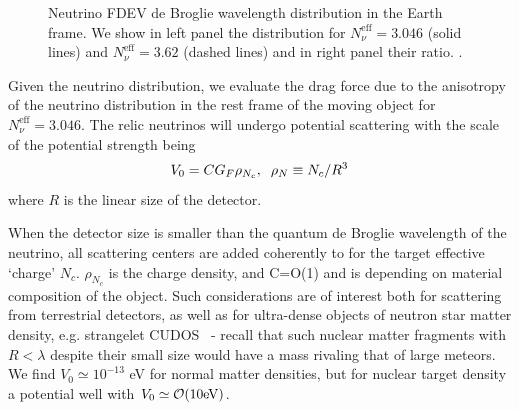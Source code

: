 \begin{figure} 
\begin{minipage}{\textwidth}
\end{minipage}
\caption{Neutrino  FDEV de Broglie wavelength  distribution in the Earth frame. We show in left panel the distribution for $N_\nu^{\mathrm{eff}}=3.046$ (solid lines) and $N_\nu^{\mathrm{eff}}=3.62$ (dashed lines) and in right panel their ratio. .  }\label{fig:deBrogle300}
 \end{figure}

Given the neutrino distribution, we evaluate the drag force due to the anisotropy of the neutrino distribution in the rest frame of the moving object for $N_\nu^{\mathrm{eff}}=3.046$. The relic neutrinos will undergo potential scattering with the scale of the potential strength being
\begin{equation}\label{V0}
V_0=CG_F\rho_{N_c},\hspace{2mm} \rho_N\equiv N_c/R^3
\end{equation}
where $R$ is the linear size of the detector.  

When the detector size is smaller than the quantum de Broglie wavelength of the neutrino, all scattering centers are added coherently to for the target effective `charge' $N_c$.  $\rho_{N_c}$ is the charge density, and C=O(1) and is depending on material composition of the object. Such considerations are of interest both for scattering from terrestrial detectors, as well as for ultra-dense objects of neutron star matter density, e.g.   strangelet  CUDOS~\cite{Rafelski:2011bby} - recall that such nuclear matter fragments with $R<\lambda$  despite their small size would have a mass rivaling that of large meteors. We find $V_0\simeq 10^{-13}$ eV for normal matter densities, but for nuclear target density a potential well with $V_0\simeq {\cal O}(10 {\rm eV})$.  

